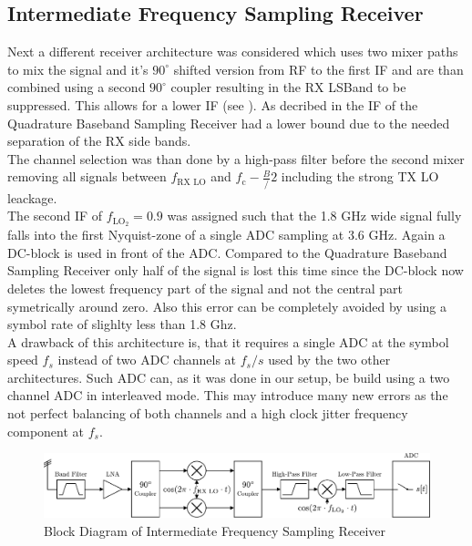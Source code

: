 \subsection{Intermediate Frequency Sampling Receiver}
\label{sec:rx_1}
Next a different receiver architecture was considered which uses
two mixer paths to mix the signal and it's $90^\circ$ shifted version
from \gls{RF} to the first \gls{IF} and are than combined using
a second $90^\circ$ coupler resulting in the \gls{RX} \gls{LSBand}
to be suppressed.
This allows for a lower \gls{IF} (see ).
As decribed in  the \gls{IF} of the
Quadrature Baseband Sampling Receiver had a lower bound due to the needed
separation of the \gls{RX} side bands. \\

The channel selection was than done by a high-pass filter before
the second mixer removing all signals between $f_{\text{RX LO}}$ and
$f_{\text{c}} - \frac{B}/{2}$ including the strong \gls{TX} \gls{LO}
leackage. \\

The second \gls{IF} of $f_{\text{LO}_2} = 0.9$ was assigned such that
the 1.8 GHz wide signal fully falls into the first Nyquist-zone of
a single \gls{ADC} sampling at 3.6 GHz. Again a \gls{DC}-block
is used in front of the \gls{ADC}. Compared to the Quadrature Baseband
Sampling Receiver only half of the signal is lost this time since
the \gls{DC}-block now deletes the lowest frequency part of the signal
and not the central part symetrically around zero. Also this error
can be completely avoided by using a symbol rate of slighlty less
than 1.8 Ghz. \\

A drawback of this architecture is, that it requires a single \gls{ADC}
at the symbol speed $f_{s}$ instead of two \gls{ADC} channels at
$f_{s} / s$ used by the two other architectures. Such \gls{ADC} can,
as it was done in our setup, be build using a two channel \gls{ADC}
in interleaved mode. This may introduce many new errors as the not
perfect balancing of both channels and a high clock jitter frequency
component at $f_{s}$. \\

\begin{figure}[ht]
  \centering
  \includegraphics[width=\textwidth]{figures/rx_1_bd}
  \caption{Block Diagram of Intermediate Frequency Sampling Receiver}
  \label{fig:rx_1_bd}
\end{figure}

